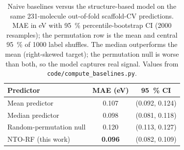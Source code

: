 \documentclass[final,3p,times,twocolumn]{elsarticle}
\begin{document}
\begin{table}[htbp]
  \centering
  \caption{Naive baselines versus the structure-based model on the same
    \num{231}-molecule out-of-fold scaffold-CV predictions. MAE in eV with
    \qty{95}{\percent} percentile-bootstrap CI (\num{2000} resamples); the
    permutation row is the mean and central \qty{95}{\percent} of \num{1000}
    label shuffles. The median outperforms the mean (right-skewed target); the
    permutation null is worse than both, so the model captures real signal.
    Values from \texttt{code/compute\_baselines.py}.}
  \label{tab:baselines}
  \footnotesize\setlength{\tabcolsep}{3pt}
  \begin{tabular}{lcc}
    \toprule
    Predictor & MAE (eV) & \qty{95}{\percent} CI \\
    \midrule
    Mean predictor          & 0.107 & (0.092, 0.124) \\
    Median predictor        & 0.098 & (0.081, 0.118) \\
    Random-permutation null & 0.120 & (0.113, 0.127) \\
    \midrule
    NTO-RF (this work)      & \textbf{0.096} & (0.082, 0.109) \\
    \bottomrule
  \end{tabular}
\end{table}
\end{document}
